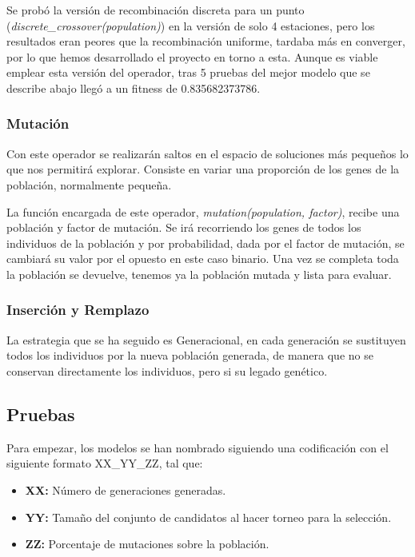 \documentclass[12pt, spanish, pdftex]{UC3M_document}
\begin{document}
Se probó la versión de recombinación discreta para un punto (\textit{discrete\_crossover(population)}) en la versión de solo 4 estaciones, pero los resultados eran peores que la recombinación uniforme, tardaba más en converger, por lo que hemos desarrollado el proyecto en torno a esta. Aunque es viable emplear esta versión del operador, tras 5 pruebas del mejor modelo que se describe abajo llegó a un fitness de 0.835682373786.

\subsubsection{Mutación}
Con este operador se realizarán saltos en el espacio de soluciones más pequeños lo que nos permitirá explorar. Consiste en variar una proporción de los genes de la población, normalmente pequeña.
\pagebreak

La función encargada de este operador, \textit{mutation(population, factor)}, recibe una población y factor de mutación. Se irá recorriendo los genes de todos los individuos de la población y por probabilidad, dada por el factor de mutación, se cambiará su valor por el opuesto en este caso binario. Una vez se completa toda la población se devuelve, tenemos ya la población mutada y lista para evaluar.

\subsubsection{Inserción y Remplazo}
La estrategia que se ha seguido es Generacional, en cada generación se sustituyen todos los individuos por la nueva población generada, de manera que no se conservan directamente los individuos, pero si su legado genético.

\subsection{Pruebas}
Para empezar, los modelos se han nombrado siguiendo una codificación con el siguiente formato XX\_YY\_ZZ, tal que:
\begin{itemize}
	\item \textbf{XX:} Número de generaciones generadas.
	\item \textbf{YY:} Tamaño del conjunto de candidatos al hacer torneo para la selección.
	\item \textbf{ZZ:} Porcentaje de mutaciones sobre la población.
\end{itemize}
\end{document}
